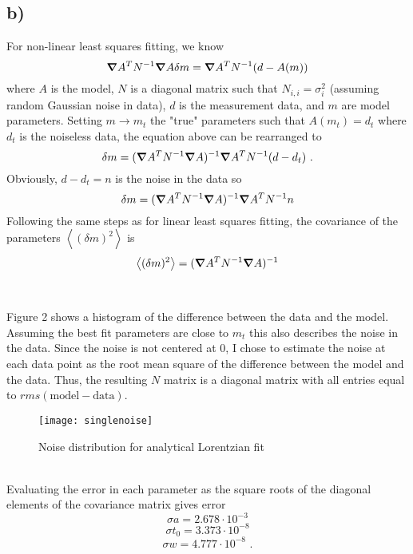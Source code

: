 \documentclass{article}
\newcommand{\<}[1]{\left\langle #1 \right\rangle }
\begin{document}
\subsection{b)}
For non-linear least squares fitting, we know
\[\grad A^T N^{-1}\grad A \delta m = \grad A^T N^{-1} (d - A(m))\]
where $A$ is the model, $N$ is a diagonal matrix such that $N_{i,i} = \sigma^2_i$ (assuming random Gaussian noise in data), $d$ is the measurement data, and $m$ are model parameters. Setting $m \to m_t$ the "true" parameters such that $A(m_t) = d_t$ where $d_t$ is the noiseless data, the equation above can be rearranged to 
\[\delta m = (\grad A^T N^{-1} \grad A)^{-1} \grad A^T N^{-1} (d-d_t) \text{ .}\]
Obviously, $d-d_t = n$ is the noise in the data so
\[\delta m = (\grad A^T N^{-1} \grad A)^{-1} \grad A^T N^{-1} n \]
Following the same steps as for linear least squares fitting, the covariance of the parameters $\<{(\delta m)^2}$ is 
\[\<{(\delta m)^2} = (\grad A^T N^{-1} \grad A)^{-1} \]\\
\\
Figure 2 shows a histogram of the difference between the data and the model. Assuming the best fit parameters are close to $m_t$ this also describes the noise in the data. Since the noise is not centered at 0, I chose to estimate the noise at each data point as the root mean square of the difference between the model and the data. Thus, the resulting $N$ matrix is a diagonal matrix with all entries equal to $rms(\text{model} - \text{data})$.
\begin{figure}[h]
	\caption{Noise distribution for analytical Lorentzian fit}
	\centering
	\texttt{[image: singlenoise]}
\end{figure}
\\
Evaluating the error in each parameter as the square roots of the diagonal elements of the covariance matrix gives error
\[\sigma a = 2.678 \cdot 10^{-3}\]
\[\sigma t_0 = 3.373 \cdot 10^{-8}\]
\[\sigma w = 4.777 \cdot 10^{-8} \text{ .}\]
\end{document}
